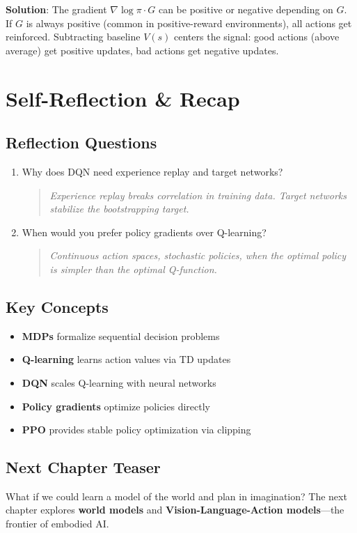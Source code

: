 \textbf{Solution}: The gradient $\nabla \log \pi \cdot G$ can be positive or negative depending on $G$. If $G$ is always positive (common in positive-reward environments), all actions get reinforced. Subtracting baseline $V(s)$ centers the signal: good actions (above average) get positive updates, bad actions get negative updates.


\section{Self-Reflection \& Recap}

\subsection{Reflection Questions}
\begin{enumerate}
    \item Why does DQN need experience replay and target networks?
    \begin{quote}
        \textit{Experience replay breaks correlation in training data. Target networks stabilize the bootstrapping target.}
    \end{quote}

    \item When would you prefer policy gradients over Q-learning?
    \begin{quote}
        \textit{Continuous action spaces, stochastic policies, when the optimal policy is simpler than the optimal Q-function.}
    \end{quote}
\end{enumerate}

\subsection{Key Concepts}
\begin{itemize}
    \item \textbf{MDPs} formalize sequential decision problems
    \item \textbf{Q-learning} learns action values via TD updates
    \item \textbf{DQN} scales Q-learning with neural networks
    \item \textbf{Policy gradients} optimize policies directly
    \item \textbf{PPO} provides stable policy optimization via clipping
\end{itemize}

\subsection{Next Chapter Teaser}
 What if we could learn a model of the world and plan in imagination? The next chapter explores \textbf{world models} and \textbf{Vision-Language-Action models}---the frontier of embodied AI.
